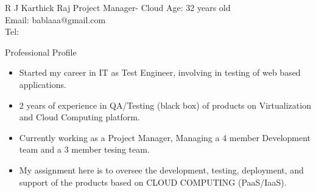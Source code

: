 \documentclass[a4paper,12pt]{article}
\begin{document}
\setmainfont



\vspace*{3\baselineskip}

\header
{R J Karthick Raj}
{Project Manager- Cloud}
{Age: 32 years old\\
Email: bablaaa@gmail.com\\
Tel: }
\newline
\newline

\begin{resumesummary}{Professional Profile}
\begin{itemize}      
  \item Started my career in IT as Test Engineer, involving in testing of web based applications.
  \item 2 years of experience in QA/Testing (black box) of products on Virtualization and Cloud Computing platform.
  \item Currently working as a Project Manager, Managing a 4 member Development team and a 3 member tesing team.
  \item My assignment here is to oversee the development, testing, deployment, and support of the products based on CLOUD COMPUTING (PaaS/IaaS). 
\newline
\end{itemize}
\end{resumesummary}

\end{document}
